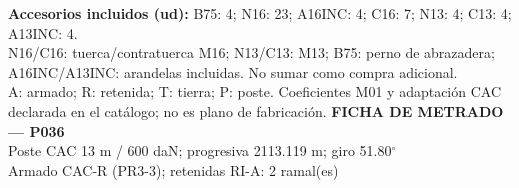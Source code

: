 \begingroup\scriptsize
\textbf{Accesorios incluidos (ud):} B75: 4; N16: 23; A16INC: 4; C16: 7; N13: 4; C13: 4; A13INC: 4.\\
N16/C16: tuerca/contratuerca M16; N13/C13: M13; B75: perno de abrazadera; A16INC/A13INC: arandelas incluidas. No sumar como compra adicional.\\
A: armado; R: retenida; T: tierra; P: poste. Coeficientes M01 y adaptación CAC declarada en el catálogo; no es plano de fabricación.
\endgroup\endgroup
\clearpage{}
\begingroup\small\setlength{\parskip}{3pt}\renewcommand{\arraystretch}{1.05}
\textbf{\large FICHA DE METRADO — P036}\\[4pt]
Poste CAC 13 m / 600 daN; progresiva 2113.119 m; giro 51.80\ensuremath{^\circ}\\
Armado CAC-R (PR3-3); retenidas RI-A: 2 ramal(es)\\
\begingroup\scriptsize
